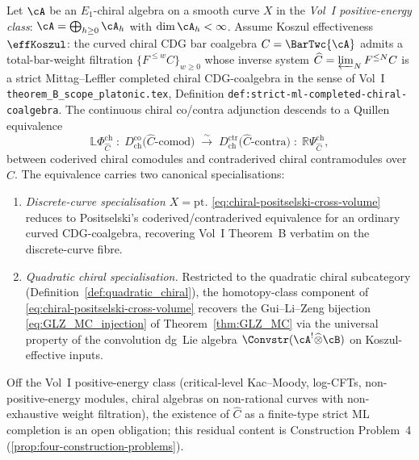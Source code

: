 \begin{theorem}
\label{thm:chiral-positselski-cross-volume}
Let $\cA$ be an $E_1$-chiral algebra on a smooth curve $X$ in the
\emph{Vol~I positive-energy class}: $\cA = \bigoplus_{h \geq 0} \cA_h$
with $\dim \cA_h < \infty$. Assume Koszul effectiveness $\effKoszul$:
the curved chiral CDG bar coalgebra $C = \BarTwc{\cA}$ admits a
total-bar-weight filtration $\{F^{\leq w} C\}_{w \geq 0}$ whose
inverse system $\widehat C = \varprojlim_N F^{\leq N} C$ is a strict
Mittag--Leffler completed chiral CDG-coalgebra in the sense of
\textup{Vol~I} \texttt{theorem\_B\_scope\_platonic.tex},
\textup{Definition} \texttt{def:strict-ml-completed-chiral-coalgebra}.
The continuous chiral co/contra adjunction descends to a Quillen
equivalence
\begin{equation}\label{eq:chiral-positselski-cross-volume}
\mathbb{L}\Phi^{\mathrm{ch}}_{\widehat C}
\;\colon\;
D^{\mathrm{co}}_{\mathrm{ch}}\bigl(\widehat C\text{-comod}\bigr)
\;\xrightarrow{\;\sim\;}\;
D^{\mathrm{ctr}}_{\mathrm{ch}}\bigl(\widehat C\text{-contra}\bigr)
\;\colon\;
\mathbb{R}\Psi^{\mathrm{ch}}_{\widehat C},
\end{equation}
between coderived chiral comodules and contraderived chiral
contramodules over $\widehat C$. The equivalence carries two
canonical specialisations:
\begin{enumerate}[label=\textup{(\arabic*)}]
\item \emph{Discrete-curve specialisation $X = \mathrm{pt}$.}
\eqref{eq:chiral-positselski-cross-volume} reduces to Positselski's
coderived/contraderived equivalence \cite[Th\'eor\`eme 6.10]{Positselski11}
for an ordinary curved CDG-coalgebra, recovering Vol~I Theorem~B
verbatim on the discrete-curve fibre.
\item \emph{Quadratic chiral specialisation.} Restricted to the
quadratic chiral subcategory \textup(Definition~\ref{def:quadratic_chiral}\textup),
the homotopy-class component of \eqref{eq:chiral-positselski-cross-volume}
recovers the Gui--Li--Zeng bijection
\eqref{eq:GLZ_MC_injection} of Theorem~\ref{thm:GLZ_MC} via the
universal property of the convolution dg~Lie algebra
$\Convstr(\cA^! \widehat\otimes \cB)$ on Koszul-effective inputs.
\end{enumerate}
Off the Vol~I positive-energy class \textup{(}critical-level
Kac--Moody, log-CFTs, non-positive-energy modules, chiral algebras
on non-rational curves with non-exhaustive weight filtration\textup{)},
the existence of $\widehat C$ as a finite-type strict ML completion
is an open obligation; this residual content is Construction
Problem~4 \textup{(}\cref{prop:four-construction-problems}\textup{)}.
\end{theorem}

